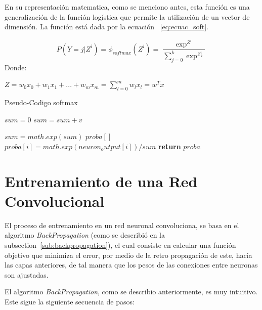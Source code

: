 En su representación matematica, como se menciono antes, esta función es una generalización de la función logística que permite la utilización de un vector de dimensión. La función está dada por la ecuación ~\ref{eq:ecuac_soft}.

\begin{equation}\label{eq:ecuac_soft}
P(Y = j|Z^i) = \phi_{softmax}(Z^i)= \frac{\exp^{Z^i}}{\sum^k_{j=0}\exp^{Z^{i}_k}}
\end{equation}
Donde:

\begin{center} $Z = w_{0}x_{0} + w_{1}x_{1} +...+w_{m}x_{m} = \sum_{l=0}^m w_{l}x_{l} = w^Tx$\end{center}

\begin{algorithm}
\caption{Pseudo-Codigo softmax}\label{alg:euclid}

\begin{algorithmic}[H]

\State $sum = 0$
	\State $sum =sum + v$
\EndFor

\State $sum = math.exp(sum) $
\State $proba[]$
	\State $proba[i] = math.exp(neuron_output[i])/sum$
\EndFor
\State \textbf{return} $proba$
\EndProcedure
\end{algorithmic}
\end{algorithm}

\section{Entrenamiento de una Red Convolucional}

El proceso de entrenamiento en un red neuronal convoluciona, se basa en el algoritmo \textit{BackPropagation} (como se describió en la subsection~\ref{sub:backpropagation}), el cual consiste en calcular una función objetivo que minimiza el error, por medio de la retro propagación de este, hacia las capas anteriores, de tal manera que los pesos de las conexiones entre neuronas son ajustadas.

El algoritmo \textit{BackPropagation}, como se describio anteriormente, es muy intuitivo. Este sigue la siguiente secuencia de pasos:

